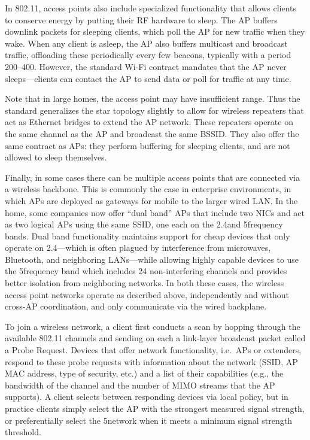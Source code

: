 In 802.11, access points also include specialized functionality that allows clients to conserve energy by putting their RF hardware to sleep. The AP buffers downlink packets for sleeping clients, which poll the AP for new traffic when they wake. When any client is asleep, the AP also buffers multicast and broadcast traffic, offloading these periodically every few beacons, typically with a period 200\ms--400\ms. However, the standard Wi-Fi contract mandates that the AP never sleeps---clients can contact the AP to send data or poll for traffic at any time.

Note that in large homes, the access point may have insufficient range. Thus the standard generalizes the star topology slightly to allow for wireless repeaters that act as Ethernet bridges to extend the AP network. These repeaters operate on the same channel as the AP and broadcast the same BSSID\@. They also offer the same contract as APs: they perform buffering for sleeping clients, and are not allowed to sleep themselves.

Finally, in some cases there can be multiple access points that are connected via a wireless backbone. This is commonly the case in enterprise environments, in which APs are deployed as gateways for mobile to the larger wired LAN\@. In the home, some companies now offer ``dual band'' APs that include two NICs and act as two logical APs using the same SSID, one each on the 2.4\GHz and 5\GHz frequency bands. Dual band functionality maintains support for cheap devices that only operate on 2.4\GHz---which is often plagued by interference from microwaves, Bluetooth, and neighboring LANs---while allowing highly capable devices to use the 5\GHz frequency band which includes 24 non-interfering channels and provides better isolation from neighboring networks. In both these cases, the wireless access point networks operate as described above, independently and without cross-AP coordination, and only communicate via the wired backplane.

To join a wireless network, a client first conducts a scan by hopping through the available 802.11 channels and sending on each a link-layer broadcast packet called a Probe Request. Devices that offer network functionality, i.e.\ APs or extenders, respond to these probe requests with information about the network (SSID, AP MAC address, type of security, etc.) and a list of their capabilities (e.g., the bandwidth of the channel and the number of MIMO streams that the AP supports). A client selects between responding devices via local policy, but in practice clients simply select the AP with the strongest measured signal strength, or preferentially select the 5\GHz network when it meets a minimum signal strength threshold.

